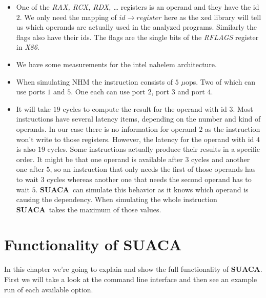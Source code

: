 \documentclass[a4paper,12pt,titlepage, twoside]{report}
\newcommand{\suaca}{\textbf{SUACA}}
\newcommand{\microops}{$\mu$ops}
\begin{document}
\begin{itemize}
    \item One of the \emph{RAX, RCX, RDX, \dots} registers is an operand and they have the id $2$. We only need the mapping of $id \rightarrow register$ here as the xed library will tell us which operands are actually used in the analyzed programs. Similarly the flags also have their ids. The flags are the single bits of the \emph{RFLAGS} register in \emph{X86}.
    \item We have some measurements for the intel nahelem architecture.
    \item When simulating NHM the instruction consists of $5$ \microops. Two of which can use ports $1$ and $5$. One each can use port $2$, port $3$ and port $4$.
    \item It will take $19$ cycles to compute the result for the operand with id $3$. Most instructions have several latency items, depending on the number and kind of operands. In our case there is no information for operand $2$ as the instruction won't write to those registers. However, the latency for the operand with id $4$ is also $19$ cycles. Some instructions actually produce their results in a specific order. It might be that one operand is available after $3$ cycles and another one after $5$, so an instruction that only needs the first of those operands has to wait $3$ cycles whereas another one that needs the second operand has to wait $5$. \suaca\ can simulate this behavior as it knows which operand is causing the dependency. When simulating the whole instruction \suaca\ takes the maximum of those values.
\end{itemize}









\chapter{Functionality of SUACA}
\label{chap:functionality}
In this chapter we're going to explain and show the full functionality of \suaca. First we will take a look at the command line interface and then see an example run of each available option.
\end{document}
